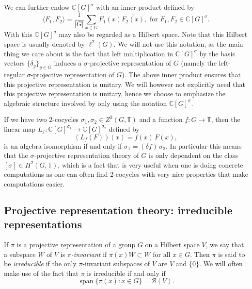 \documentclass[11pt, oneside, reqno]{amsart}
\newcommand{\calB}{\mathcal{B}}
\newcommand{\bbC}{\mathbb{C}}
\newcommand{\bbT}{\mathbb{T}}
\newcommand{\Span}{\operatorname{span}}
\theoremstyle{definition}
\theoremstyle{plain}
\theoremstyle{remark}
\begin{document}
We can further endow $\bbC[G]^\sigma$ with an inner product defined by
\begin{equation}\label{eqn:inner product}
    \langle F_1, F_2 \rangle = \frac{1}{|G|} \sum_{x \in G}F_1(x) \overline{F_2(x)}, \text{ for } F_1,F_2 \in \bbC[G]^\sigma.
\end{equation}
With this $\bbC[G]^\sigma$ may also be regarded as a Hilbert space. Note that this Hilbert space is usually denoted by $\ell^2(G)$. We will not use this notation, as the main thing we care about is the fact that left multiplication in $\bbC[G]^\sigma$ by the basis vectors $\{\delta_y\}_{y \in G}$ induces a $\sigma$-projective representation of $G$ (namely the left-regular $\sigma$-projective representation of $G$). The above inner product ensures that this projective representation is unitary. We will however not explicitly need that this projective representation is unitary, hence we choose to emphasize the algebraic structure involved by only using the notation $\bbC[G]^\sigma$.

If we have two 2-cocycles $\sigma_1,\sigma_2 \in Z^2(G,\bbT)$ and a function $f \colon G \to \bbT$, then the linear map $L_f \colon \bbC[G]^{\sigma_1} \to \bbC[G]^{\sigma_2}$ defined by
\begin{equation*}
    (L_f(F))(x) = f(x) \, F(x),
\end{equation*}
is an algebra isomorphism if and only if $\sigma_1 = (\delta f) \, \sigma_2$. In particular this means that the $\sigma$-projective representation theory of $G$ is only dependent on the class $[\sigma] \in H^2(G, \bbT)$, which is a fact that is very useful when one is doing concrete computations as one can often find 2-cocycles with very nice properties that make computations easier.

\subsection{Projective representation theory: irreducible representations}

If $\pi$ is a projective representation of a group $G$ on a Hilbert space $V$, we say that a subspace $W$ of $V$ is \emph{$\pi$-invariant} if $\pi(x)W \subset W$ for all $x \in G$. Then $\pi$ is said to be \emph{irreducible} if the only $\pi$-invariant subspaces of $V$ are $V$ and $\{0\}$. We will often make use of the fact that $\pi$ is irreducible if and only if
\begin{equation*}
    \Span\{\pi(x) \colon x \in G \} = \calB(V).
\end{equation*}
\end{document}
